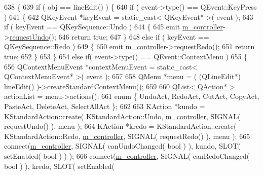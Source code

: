 \begin{DoxyCode}
638 \{
639     \textcolor{keywordflow}{if} ( obj == lineEdit() ) \{
640         \textcolor{keywordflow}{if} ( event->type() == QEvent::KeyPress )
641         \{
642             QKeyEvent *keyEvent = \textcolor{keyword}{static\_cast<} QKeyEvent* \textcolor{keyword}{>}( event );
643             \textcolor{keywordflow}{if} ( keyEvent == QKeySequence::Undo )
644             \{
645                 emit \hyperlink{classFormWidgetIface_a2d51d0c5aaf48aad5480551f69f82e9a}{m\_controller}->\hyperlink{classFormWidgetsController_a90e5af0601c7e5efcfbf6e1b93ae5641}{requestUndo}();
646                 \textcolor{keywordflow}{return} \textcolor{keyword}{true};
647             \}
648             \textcolor{keywordflow}{else} \textcolor{keywordflow}{if} ( keyEvent == QKeySequence::Redo )
649             \{
650                 emit \hyperlink{classFormWidgetIface_a2d51d0c5aaf48aad5480551f69f82e9a}{m\_controller}->\hyperlink{classFormWidgetsController_a828b4d568a04cd6728bcf1d49ed5c425}{requestRedo}();
651                 \textcolor{keywordflow}{return} \textcolor{keyword}{true};
652             \}
653         \}
654         \textcolor{keywordflow}{else} \textcolor{keywordflow}{if}( event->type() == QEvent::ContextMenu )
655         \{
656             QContextMenuEvent *contextMenuEvent = \textcolor{keyword}{static\_cast<} QContextMenuEvent* \textcolor{keyword}{>}( event );
657 
658             QMenu *menu = ( (QLineEdit*) lineEdit() )->createStandardContextMenu();
659 
660             \hyperlink{classQList}{QList< QAction* >} actionList = menu->actions();
661             \textcolor{keyword}{enum} \{ UndoAct, RedoAct, CutAct, CopyAct, PasteAct, DeleteAct, SelectAllAct \};
662 
663             KAction *kundo = KStandardAction::create( KStandardAction::Undo, 
      \hyperlink{classFormWidgetIface_a2d51d0c5aaf48aad5480551f69f82e9a}{m\_controller}, SIGNAL( requestUndo() ), menu );
664             KAction *kredo = KStandardAction::create( KStandardAction::Redo, 
      \hyperlink{classFormWidgetIface_a2d51d0c5aaf48aad5480551f69f82e9a}{m\_controller}, SIGNAL( requestRedo() ), menu );
665             connect(\hyperlink{classFormWidgetIface_a2d51d0c5aaf48aad5480551f69f82e9a}{m\_controller}, SIGNAL( canUndoChanged( \textcolor{keywordtype}{bool} ) ), kundo, SLOT( setEnabled( \textcolor{keywordtype}{
      bool} ) ) );
666             connect(\hyperlink{classFormWidgetIface_a2d51d0c5aaf48aad5480551f69f82e9a}{m\_controller}, SIGNAL( canRedoChanged( \textcolor{keywordtype}{bool} ) ), kredo, SLOT( setEnabled( \textcolor{keywordtype}{
}
\end{DoxyCode}
